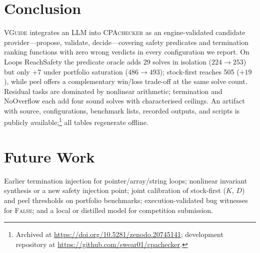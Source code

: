 \documentclass[runningheads]{llncs}
\newcommand{\tool}{\textsc{VGuide}}
\newcommand{\cpa}{\textsc{CPAchecker}}
\begin{document}
\section{Conclusion}
\label{sec:concl}

\tool{} integrates an LLM into \cpa{} as an engine-validated candidate provider---propose, validate,
decide---covering safety predicates and termination ranking functions with zero wrong verdicts in
every configuration we report. On Loops ReachSafety the predicate oracle adds 29 solves in isolation
($224{\to}253$) but only $+7$ under portfolio saturation ($486{\to}493$); stock-first reaches 505
($+19$), while peel offers a complementary win/loss trade-off at the same solve count. Residual tasks
are dominated by nonlinear arithmetic; termination
and NoOverflow each add four sound solves with characterised ceilings. An artifact with source,
configurations, benchmark lists, recorded outputs, and scripts is publicly
available;\footnote{Archived at \url{https://doi.org/10.5281/zenodo.20745141}; development
repository at \url{https://github.com/swear01/cpachecker}.} all tables regenerate offline.

\section{Future Work}
\label{sec:future}

Earlier termination injection for pointer/array/string loops; nonlinear invariant synthesis or a new
safety injection point; joint calibration of stock-first ($K$, $D$) and peel thresholds on portfolio
benchmarks; execution-validated bug witnesses for \textsc{False}; and a local or distilled
model for competition submission.



\end{document}
